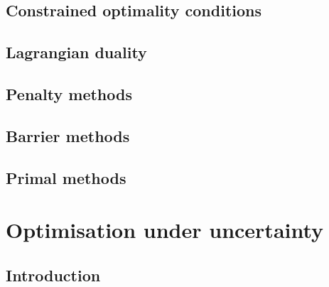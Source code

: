 \documentclass{bookest}
\begin{document}
	\chapter{Constrained optimality conditions}
		
	
	\chapter{Lagrangian duality}
		
	
	\chapter{Penalty methods}
	
	
	\chapter{Barrier methods}
	
	
	\chapter{Primal methods}
	
	
	
	\part{Optimisation under uncertainty} \label{part_3}
	
	\chapter{Introduction}
	
	
\end{document}

